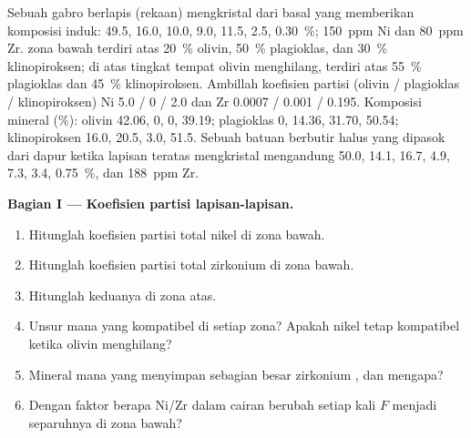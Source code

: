 \begin{problem}
\label{pb:b2:magmatic-differentiation:1}
Sebuah  gabro berlapis (rekaan) mengkristal dari basal yang 
memberikan komposisi induk:  49.5,  16.0,  10.0,
 9.0,  11.5,  2.5,  \qty{0.30}{\percent};
\qty{150}{ppm} Ni dan \qty{80}{ppm} Zr.  zona bawah terdiri atas
\qty{20}{\percent} olivin, \qty{50}{\percent} plagioklas, dan \qty{30}{\percent}
klinopiroksen; di atas tingkat tempat olivin menghilang,  terdiri atas \qty{55}{\percent}
plagioklas dan \qty{45}{\percent} klinopiroksen. Ambillah koefisien partisi
(olivin / plagioklas / klinopiroksen) Ni 5.0 / 0 / 2.0 dan Zr 0.0007 / 0.001 /
0.195. Komposisi mineral (\unit{\percent}): olivin  42.06,  0,
 0,  39.19; plagioklas 0, 14.36, 31.70, 50.54; klinopiroksen
16.0, 20.5, 3.0, 51.5. Sebuah 
batuan berbutir halus yang dipasok dari dapur  ketika lapisan teratas mengkristal mengandung
 50.0,  14.1,  16.7,  4.9,  7.3,
 3.4,  \qty{0.75}{\percent}, dan \qty{188}{ppm} Zr.

\noindent\textbf{Bagian I --- Koefisien partisi lapisan-lapisan.}
\begin{enumerate}
\item Hitunglah koefisien partisi total nikel di zona bawah.
\item Hitunglah koefisien partisi total zirkonium di zona bawah.
\item Hitunglah keduanya di zona atas.
\item Unsur mana yang kompatibel di setiap zona? Apakah nikel tetap kompatibel ketika
olivin menghilang?
\item Mineral mana yang menyimpan sebagian besar zirkonium , dan mengapa?
\item Dengan faktor berapa Ni/Zr dalam cairan berubah setiap kali $F$ menjadi separuhnya di zona
bawah?
\end{enumerate}


\end{problem}
